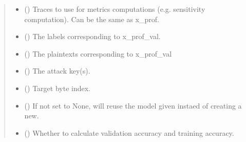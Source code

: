 \documentclass[letterpaper,10pt,english]{sphinxmanual}
\begin{document}
\begin{fulllineitems}
\begin{fulllineitems}
\begin{quote}
\begin{description}
\begin{itemize}
\item {} 
\sphinxAtStartPar
{} () \textendash{} Traces to use for metrics computations (e.g. sensitivity computation). Can be
the same as x\_prof.

\item {} 
\sphinxAtStartPar
{} (\sphinxstyleliteralemphasis{\sphinxupquote{{[}}}\sphinxstyleliteralemphasis{\sphinxupquote{{]}}}) \textendash{} The labels corresponding to x\_prof\_val.

\item {} 
\sphinxAtStartPar
{}\sphinxstyleliteralstrong{\sphinxupquote{{[}}}\sphinxstyleliteralstrong{\sphinxupquote{{]}}} () \textendash{} The plaintexts corresponding to x\_prof\_val

\item {} 
\sphinxAtStartPar
{} (\sphinxstyleliteralemphasis{\sphinxupquote{{[}}}\sphinxstyleliteralemphasis{\sphinxupquote{{[}}}\sphinxstyleliteralemphasis{\sphinxupquote{{]}}}\sphinxstyleliteralemphasis{\sphinxupquote{{]}}}) \textendash{} The attack key(s).

\item {} 
\sphinxAtStartPar
{} () \textendash{} Target byte index.

\item {} 
\sphinxAtStartPar
{} (\sphinxstyleliteralemphasis{\sphinxupquote{, }}) \textendash{} If not set to None, will re\sphinxhyphen{}use the model given instaed of creating a new.

\item {} 
\sphinxAtStartPar
{} (\sphinxstyleliteralemphasis{\sphinxupquote{, }}) \textendash{} Whether to calculate validation accuracy and training accuracy.


\end{itemize}
\end{description}
\end{quote}
\end{fulllineitems}
\end{fulllineitems}
\end{document}
